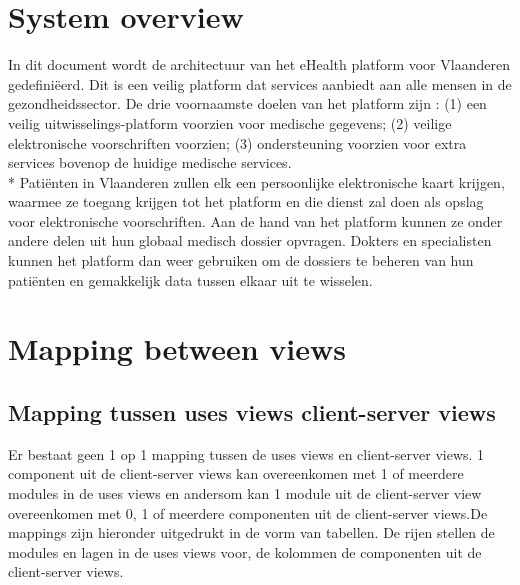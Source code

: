 \documentclass[a4paper,10pt]{article}
\begin{document}
\clearpage
\section{System overview}
In dit document wordt de architectuur van het eHealth platform voor Vlaanderen gedefiniëerd. Dit is een veilig platform dat services aanbiedt aan alle mensen in de gezondheidssector. De drie voornaamste doelen van het platform zijn : (1) een veilig uitwisselings-platform voorzien voor medische gegevens; (2) veilige elektronische voorschriften voorzien; (3) ondersteuning voorzien voor extra services bovenop de huidige medische services.\\*
Patiënten in Vlaanderen zullen elk een persoonlijke elektronische kaart krijgen, waarmee ze toegang krijgen tot het platform en die dienst zal doen als opslag voor elektronische voorschriften. Aan de hand van het platform kunnen ze onder andere delen uit hun globaal medisch dossier opvragen. Dokters en specialisten kunnen het platform dan weer gebruiken om de dossiers te beheren van hun patiënten en gemakkelijk data tussen elkaar uit te wisselen.

\clearpage
\section{Mapping between views}
\label{Mappingbetweenviews}

\subsection{Mapping tussen uses views client-server views}
Er bestaat geen 1 op 1 mapping tussen de uses views en client-server views. 1 component uit de client-server views kan overeenkomen met 1 of meerdere modules in de uses views en andersom kan 1 module uit de client-server view overeenkomen met 0, 1 of meerdere componenten uit de client-server views.De mappings zijn hieronder uitgedrukt in de vorm van tabellen. De rijen stellen de modules en lagen in de uses views voor, de kolommen de componenten uit de client-server views. 
\end{document}
